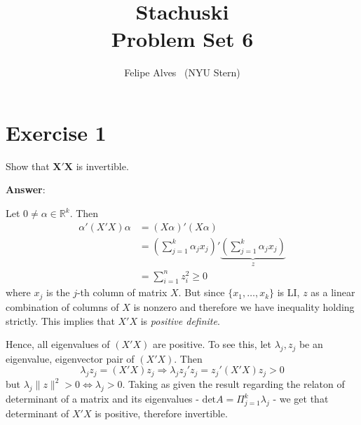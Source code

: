 \documentclass[11pt,twoside,fleqn,reqno,a4paper]{amsart}
\author@andify\authors
\author{Felipe Alves \ (NYU Stern)}
\title{\normalfont\bf Stachuski \\ Problem Set 6 }
\date{}
\numberwithin{equation}{section}
\newcommand{\matr}[1]{\mathbf{#1}} %
\begin{document}
\maketitle

\section*{Exercise 1}
\setcounter{section}{3}
\begin{em}
Show that $\matr{X}'\matr{X}$ is invertible.
\end{em}

\textbf{Answer}:

Let $0 \ne \alpha \in \mathbb{R}^k$. Then
\begin{align*}
\alpha' ( X'X ) \alpha & = ( X\alpha )' ( X \alpha ) \\
                       & = \left( \sum_{j=1}^k \alpha_j x_j \right)'   \underbrace{\left( \sum_{j=1}^k \alpha_j x_j \right)}_{z} \\
                       & = \sum_{i=1}^n z_i^2 \ge 0                 
\end{align*}
where $x_j$ is the $j$-th column of matrix $X$. 
But since $\{x_1,\ldots, x_k\}$ is LI, $ z $ as a linear combination of columns of $X$ is nonzero  
and therefore we have inequality holding strictly. 
This implies that $ X'X $ is \emph{positive definite}. 

Hence, all eigenvalues of $ ( X'X ) $ are positive. 
To see this, let $ \lambda_j,z_j $ be an eigenvalue, eigenvector pair of $ ( X'X ) $. Then
\[ 
    \lambda_j z_j = ( X'X )z_j \Rightarrow \lambda_j z_j'z_j = z_j' ( X'X ) z_j >0
\]
but $\lambda_j \lVert z \rVert^2>0 \Leftrightarrow \lambda_j >0$. 
Taking as given the result regarding the relaton of determinant of a matrix and its eigenvalues - $ \text{det} A = \Pi_{j=1}^k \lambda_j $ - 
we get that determinant of $ X'X $ is positive, therefore invertible.
\end{document}
